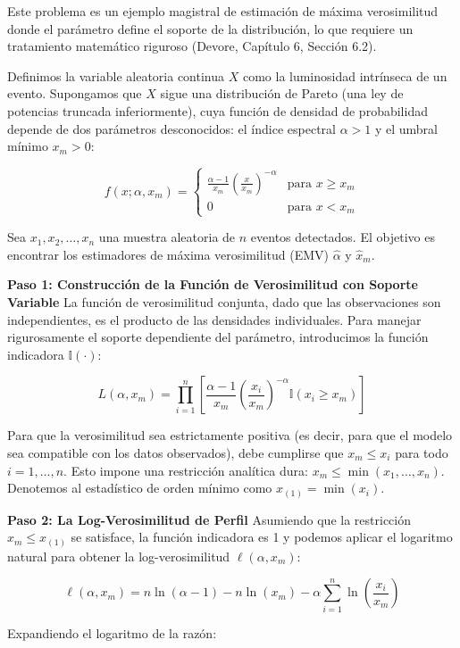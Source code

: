 Este problema es un ejemplo magistral de estimación de máxima verosimilitud donde el parámetro define el soporte de la distribución, lo que requiere un tratamiento matemático riguroso (Devore, Capítulo 6, Sección 6.2).

Definimos la variable aleatoria continua $X$ como la luminosidad intrínseca de un evento. Supongamos que $X$ sigue una distribución de Pareto (una ley de potencias truncada inferiormente), cuya función de densidad de probabilidad depende de dos parámetros desconocidos: el índice espectral $\alpha > 1$ y el umbral mínimo $x_m > 0$:

$$
f(x; \alpha, x_m) = 
\begin{cases} 
\frac{\alpha - 1}{x_m} \left( \frac{x}{x_m} \right)^{-\alpha} & \text{para } x \ge x_m \\
0 & \text{para } x < x_m
\end{cases}
$$

Sea $x_1, x_2, \dots, x_n$ una muestra aleatoria de $n$ eventos detectados. El objetivo es encontrar los estimadores de máxima verosimilitud (EMV) $\hat{\alpha}$ y $\hat{x}_m$.

\textbf{Paso 1: Construcción de la Función de Verosimilitud con Soporte Variable}
La función de verosimilitud conjunta, dado que las observaciones son independientes, es el producto de las densidades individuales. Para manejar rigurosamente el soporte dependiente del parámetro, introducimos la función indicadora $\mathbb{I}(\cdot)$:

$$ L(\alpha, x_m) = \prod_{i=1}^{n} \left[ \frac{\alpha - 1}{x_m} \left( \frac{x_i}{x_m} \right)^{-\alpha} \mathbb{I}(x_i \ge x_m) \right] $$

Para que la verosimilitud sea estrictamente positiva (es decir, para que el modelo sea compatible con los datos observados), debe cumplirse que $x_m \le x_i$ para todo $i = 1, \dots, n$. Esto impone una restricción analítica dura: $x_m \le \min(x_1, \dots, x_n)$. Denotemos al estadístico de orden mínimo como $x_{(1)} = \min(x_i)$.

\textbf{Paso 2: La Log-Verosimilitud de Perfil}
Asumiendo que la restricción $x_m \le x_{(1)}$ se satisface, la función indicadora es 1 y podemos aplicar el logaritmo natural para obtener la log-verosimilitud $\ell(\alpha, x_m)$:

$$ \ell(\alpha, x_m) = n \ln(\alpha - 1) - n \ln(x_m) - \alpha \sum_{i=1}^{n} \ln\left( \frac{x_i}{x_m} \right) $$

Expandiendo el logaritmo de la razón:

